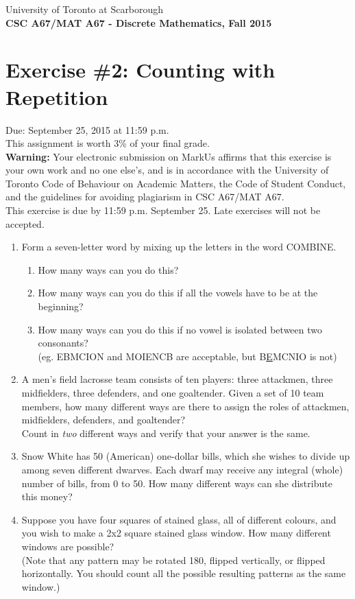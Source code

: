 \documentclass{article}
\begin{document}
{\large \noindent{}University of Toronto at Scarborough\\
\textbf{CSC A67/MAT A67 - Discrete Mathematics, Fall 2015}}

\section*{\huge Exercise \#2: Counting with Repetition}

{\large Due: September 25, 2015 at 11:59 p.m.\\
This assignment is worth 3\% of your final grade.}\\[1em]
\textbf{Warning:} Your electronic submission on MarkUs affirms that this exercise is your own work and no
one else's, and is in accordance with the University of Toronto Code of Behaviour on Academic Matters,
the Code of Student Conduct, and the guidelines for avoiding plagiarism in CSC A67/MAT A67.\\[1ex]
This exercise is due by 11:59 p.m. September 25. Late exercises will not be accepted.\\[1ex]
\renewcommand{\labelenumi}{\arabic{enumi}.}
\renewcommand{\labelenumii}{(\alph{enumii})}
\begin{enumerate}
\item Form\marginpar{[6]} a seven-letter word by mixing up the letters in the word COMBINE.
	\begin{enumerate}
	\item How many ways can you do this?
	\item How many ways can you do this if all the vowels have to be at the beginning?
	\item How many ways can you do this if no vowel is isolated between two consonants?\\
	(eg. EBMCION and MOIENCB are acceptable, but B\underline{E}MCNIO is not)
	\end{enumerate}
\item A\marginpar{[3]} men's field lacrosse team consists of ten players: three attackmen, three midfielders, three defenders, and one goaltender. Given a set of 10 team members, how many different ways are there to assign the roles of attackmen, midfielders, defenders, and goaltender?\\
Count in \textit{two} different ways and verify that your answer is the same.
\item Snow\marginpar{[2]} White has 50 (American) one-dollar bills, which she wishes to divide up among seven different dwarves. Each dwarf may receive any integral (whole) number of bills, from 0 to 50. How many different ways can she distribute this money?
\item Suppose\marginpar{[3]} you have four squares of stained glass, all of different colours, and you wish to make a 2x2 square stained glass window. How many different windows are possible?\\
(Note that any pattern may be rotated 180\textdegree, flipped vertically, or flipped horizontally. You should count all the possible resulting patterns as the same window.)
\end{enumerate}
\hrulefill\\
\label{end}
\end{document}
